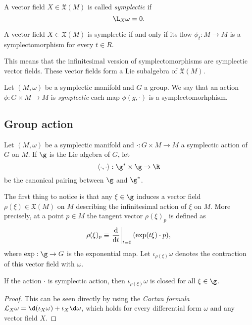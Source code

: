 \documentclass{worksheetclass}
\begin{document}
        \begin{defn}
            A vector field $X\in\mathfrak{X}(M)$ is called \emph{symplectic} if
            \begin{equation*}
                \L_X\omega = 0.
            \end{equation*}
        \end{defn}
        \begin{prop}
            A vector field $X\in\mathfrak{X}(M)$ is symplectic if and only if its flow $\phi_t:M\to M$ is a symplectomorphism for every $t\in R$.
        \end{prop}
        This means that the infinitesimal version of symplectomorphisms are symplectic vector fields. These vector fields form a Lie subalgebra of $\mathfrak{X}(M)$.

        \begin{defn}
            Let $(M,\omega)$ be a symplectic manifold and $G$ a group. We say that an action $\phi:G\times M\to M$ is \emph{symplectic} each map $\phi(g,\cdot)$ is a symplectomorhphism.
        \end{defn}

    \subsection{Group action}

        Let $(M,\omega)$ be a symplectic manifold and $\cdot:G\times M\to M$ a symplectic action of $G$ on $M$. If $\g$ is the Lie algebra of $G$, let
        \begin{equation}
            \langle\cdot,\cdot\rangle : \g^*\times\g\to\R
        \end{equation}
        be the canonical pairing between $\g$ and $\g^*$. 
        
        The first thing to notice is that any $\xi\in\g$ induces a vector field $\rho(\xi)\in\mathfrak{X}(M)$ on $M$ describing the infinitesimal action of $\xi$ on $M$. More precisely, at a point $p\in M$ the tangent vector $\rho(\xi)_p$ is defined as
        \begin{equation}
            \rho(\xi)_p\equiv\eval{\dv{}{t}}_{t=0}(\exp(t\xi)\cdot p),
        \end{equation}
        where $\exp:\g\to G$ is the exponential map. Let $\iota_{\rho(\xi)}\omega$ denotes the contraction of this vector field with $\omega$.
        \begin{prop}
            If the action $\cdot$ is symplectic action, then $\iota_{\rho(\xi)}\omega$ is closed for all $\xi\in\g$.
        \end{prop}
        \begin{proof}
            This can be seen directly by using the \emph{Cartan formula} $\mathcal{L}_X\omega=\d(\iota_X\omega)+\iota_X\d\omega$, which holds for every differential form $\omega$ and any vector field $X$.
        \end{proof}
\end{document}
